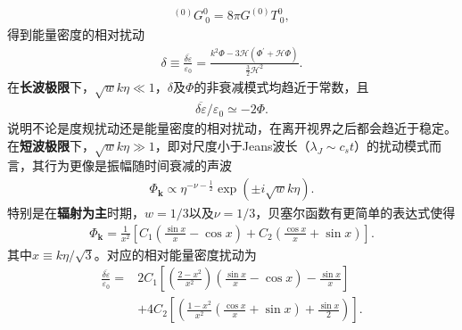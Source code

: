 \begin{align}
  ^{(0)}G^{0}_{~0} =8\pi G ^{(0)}T^{0}_{~0}, 
\end{align}
得到能量密度的相对扰动
\begin{align}
  \label{eq:gauge-invariant-relative-energy-density-perturbation}
  \delta\equiv\frac{\overline{\delta\varepsilon}}{\varepsilon_0}
  =\frac{k^2 \Phi -3\mathcal{H}{\left(\Phi^\prime+\mathcal{H}\Phi\right)}}{\frac{3}{2}\mathcal{H}^2}.
\end{align}
在\textbf{长波极限}下，$\sqrt{w}k\eta\ll
1$，$\delta$及$\Phi$的非衰减模式均趋近于常数，且
\begin{align}
  \overline{\delta\varepsilon} /\varepsilon_0\simeq -2\Phi.
\end{align}
说明不论是度规扰动还是能量密度的相对扰动，在离开视界之后都会趋近于稳定。\\
在\textbf{短波极限}下，$\sqrt{w}k\eta\gg 1$，即对尺度小于Jeans波长（$\lambda_{J}\sim
c_{s}t$）的扰动模式而言，其行为更像是振幅随时间衰减的声波
\begin{align}
  \Phi_{\mathbf{k}}\propto \eta^{-\nu-\frac{1}{2}}\exp{\left(\pm
  i\sqrt{w}k\eta\right)}. 
\end{align}
特别是在\textbf{辐射为主}时期，$w=1 /3$以及$\nu=1
/3$，贝塞尔函数有更简单的表达式使得
\begin{align}
  \label{eq:Phi-in-radiation-dominated}
  \Phi_{\mathbf{k}}=\frac{1}{x^2}{\left[
  C_1{\left(\frac{\sin x}{x}-\cos x\right)}+
  C_2{\left(\frac{\cos x}{x}+\sin x\right)}\right]}.
\end{align}
其中$x\equiv k\eta /\sqrt{3}$。对应的相对能量密度扰动为
\begin{align}
  \frac{\overline{\delta\varepsilon}}{\varepsilon_0}=
  &2C_1{\left[{\left(\frac{2-x^2}{x^2}\right)}{\left(\frac{\sin x}{x}-\cos x\right)}-\frac{\sin x}{x}\right]}
  \\
  &+4C_2{\left[{\left(\frac{1-x^2}{x^2}{\left(\frac{\cos x}{x}+\sin x\right)}+\frac{\sin x}{2}\right)}\right]}.
\end{align}

